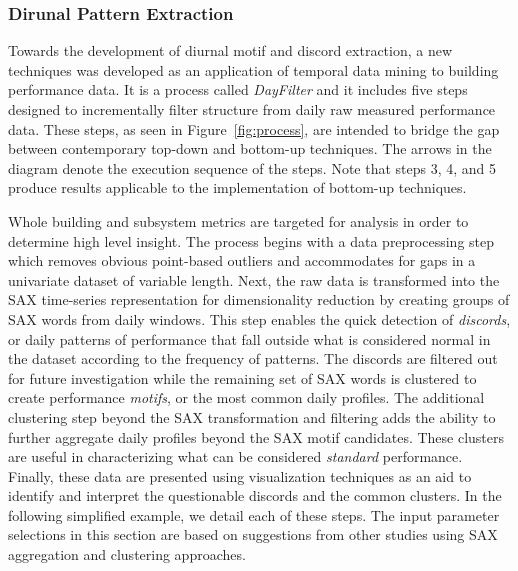 \subsubsection{Dirunal Pattern Extraction}
\label{sec:dayfilter}

Towards the development of diurnal motif and discord extraction, a new techniques was developed as an application of temporal data mining to building performance data. It is a process called \emph{DayFilter} and it includes five steps designed to incrementally filter structure from daily raw measured performance data. These steps, as seen in Figure~\ref{fig:process}, are intended to bridge the gap between contemporary top-down and bottom-up techniques. The arrows in the diagram denote the execution sequence of the steps. Note that steps 3, 4, and 5 produce results applicable to the implementation of bottom-up techniques.  

Whole building and subsystem metrics are targeted for analysis in order to determine high level insight. The process begins with a data preprocessing step which removes obvious point-based outliers and accommodates for gaps in a univariate dataset of variable length. Next, the raw data is transformed into the SAX time-series representation for dimensionality reduction by creating groups of SAX words from daily windows. This step enables the quick detection of \emph{discords}, or daily patterns of performance that fall outside what is considered normal in the dataset according to the frequency of patterns. The discords are filtered out for future investigation while the remaining set of SAX words is clustered to create performance \emph{motifs}, or the most common daily profiles. The additional clustering step beyond the SAX transformation and filtering adds the ability to further aggregate daily profiles beyond the SAX motif candidates. These clusters are useful in characterizing what can be considered \emph{standard} performance. Finally, these data are presented using visualization techniques as an aid to identify and interpret the questionable discords and the common clusters. In the following simplified example, we detail each of these steps. The input parameter selections in this section are based on suggestions from other studies using SAX aggregation and clustering approaches. 

